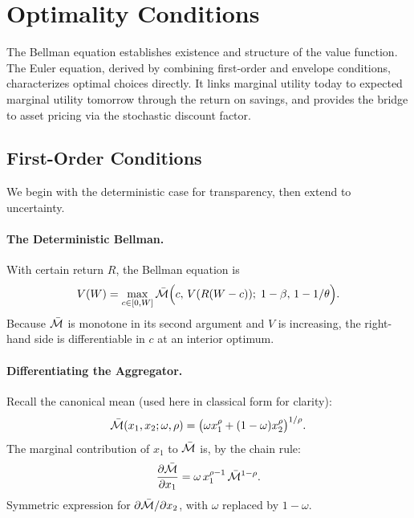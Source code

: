 \section{Optimality Conditions}
\label{sec:dp-euler}

The Bellman equation establishes existence and structure of the value function. The Euler equation, derived by combining first-order and envelope conditions, characterizes optimal choices directly. It links marginal utility today to expected marginal utility tomorrow through the return on savings, and provides the bridge to asset pricing via the stochastic discount factor.

\subsection{First-Order Conditions}
\label{subsec:dp-foc}

We begin with the deterministic case for transparency, then extend to uncertainty.

\paragraph{The Deterministic Bellman.}
With certain return $R$, the Bellman equation is
\begin{equation}
V(W) = \max_{c \in [0, W]} \bar{\mathcal{M}}\Big( c, \, V(R(W-c)); \; 1-\beta, \, 1-1/\theta \Big).
\label{eq:bellman-det}
\end{equation}
Because $\bar{\mathcal{M}}$ is monotone in its second argument and $V$ is increasing, the right-hand side is differentiable in $c$ at an interior optimum.

\paragraph{Differentiating the Aggregator.}
Recall the canonical mean (used here in classical form for clarity):
\begin{equation}
\bar{\mathcal{M}}(x_1, x_2; \omega, \rho) = \big( \omega x_1^\rho + (1-\omega) x_2^\rho \big)^{1/\rho}.
\label{eq:agg-recall}
\end{equation}
The marginal contribution of $x_1$ to $\bar{\mathcal{M}}$ is, by the chain rule:
\begin{equation}
\frac{\partial \bar{\mathcal{M}}}{\partial x_1} = \omega \, x_1^{\rho-1} \, \bar{\mathcal{M}}^{1-\rho}.
\label{eq:dMbar-dx1}
\end{equation}
Symmetric expression for $\partial \bar{\mathcal{M}} / \partial x_2$, with $\omega$ replaced by $1-\omega$.

